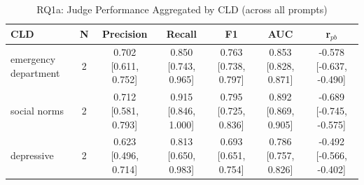 \begin{table}[htbp]
\centering
\caption{RQ1a: Judge Performance Aggregated by CLD (across all prompts)}
\label{tab:rq1a_by_cld}
\begin{tabular}{lcccccc}
\toprule
\textbf{CLD} & \textbf{N} & \textbf{Precision} & \textbf{Recall} & \textbf{F1} & \textbf{AUC} & \textbf{r$_{pb}$} \\
\midrule
emergency department & 2 & 0.702 [0.611, 0.752] & 0.850 [0.743, 0.965] & 0.763 [0.738, 0.797] & 0.853 [0.828, 0.871] & -0.578 [-0.637, -0.490] \\
social norms & 2 & 0.712 [0.581, 0.793] & 0.915 [0.846, 1.000] & 0.795 [0.725, 0.836] & 0.892 [0.869, 0.905] & -0.689 [-0.745, -0.575] \\
depressive & 2 & 0.623 [0.496, 0.714] & 0.813 [0.650, 0.983] & 0.693 [0.651, 0.754] & 0.786 [0.757, 0.826] & -0.492 [-0.566, -0.402] \\
\bottomrule
\end{tabular}
\end{table}